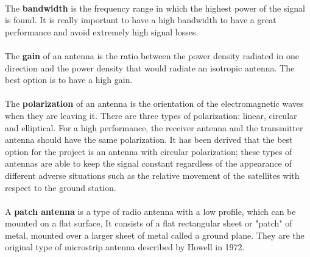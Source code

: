 \paragraph{}The \textbf{bandwidth} is the frequency range in which the highest power of the signal is found. It is really important to have a high bandwidth to have a great performance and avoid extremely high signal losses.

\paragraph{}The \textbf{gain} of an antenna is the ratio between the power density radiated in one direction and the power density that would radiate an isotropic antenna. The best option is to have a high gain. 

\paragraph{}The \textbf{polarization} of an antenna is the orientation of the electromagnetic waves when they are leaving it. There are three types of polarization: linear, circular and elliptical. For a high performance, the receiver antenna and the transmitter antenna should have the same polarization. It has been derived that the best option for the project is an antenna with circular polarization; these types of antennas are able to keep the signal constant regardless of the appearance of different adverse situations such as the relative movement of the satellites with respect to the ground station. 

\paragraph{}A \textbf{patch antenna} is a type of radio antenna with a low profile, which can be mounted on a flat surface, It consists of a flat rectangular sheet or "patch" of metal, mounted over a larger sheet of metal called a ground plane. They are the original type of microstrip antenna described by Howell in 1972. \cite[wikipedia]{patch}

